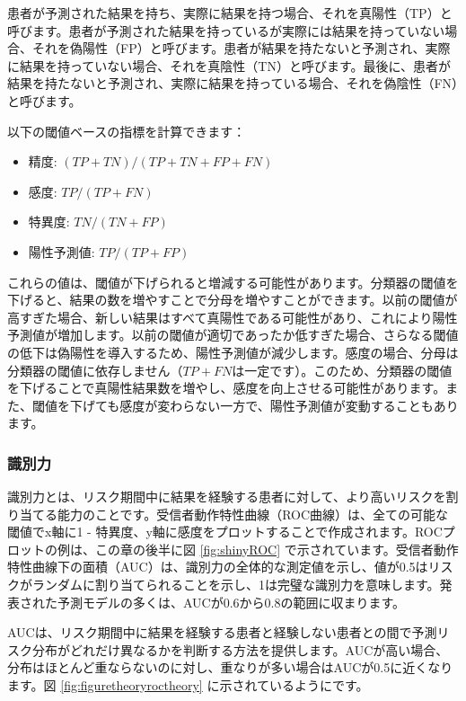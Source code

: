 \documentclass[
  11pt]{book}
\providecommand{\tightlist}{%
  \setlength{\itemsep}{0pt}\setlength{\parskip}{0pt}}
\theoremstyle{definition}
\theoremstyle{definition}
\theoremstyle{definition}
\theoremstyle{definition}
\theoremstyle{remark}
\begin{document}
患者が予測された結果を持ち、実際に結果を持つ場合、それを真陽性（TP）と呼びます。患者が予測された結果を持っているが実際には結果を持っていない場合、それを偽陽性（FP）と呼びます。患者が結果を持たないと予測され、実際に結果を持っていない場合、それを真陰性（TN）と呼びます。最後に、患者が結果を持たないと予測され、実際に結果を持っている場合、それを偽陰性（FN）と呼びます。    

以下の閾値ベースの指標を計算できます：

\begin{itemize}
\tightlist
\item
  精度: \((TP+TN)/(TP+TN+FP+FN)\)
\item
  感度: \(TP/(TP+FN)\)
\item
  特異度: \(TN/(TN+FP)\)
\item
  陽性予測値: \(TP/(TP+FP)\)
\end{itemize}

これらの値は、閾値が下げられると増減する可能性があります。分類器の閾値を下げると、結果の数を増やすことで分母を増やすことができます。以前の閾値が高すぎた場合、新しい結果はすべて真陽性である可能性があり、これにより陽性予測値が増加します。以前の閾値が適切であったか低すぎた場合、さらなる閾値の低下は偽陽性を導入するため、陽性予測値が減少します。感度の場合、分母は分類器の閾値に依存しません（\(TP+FN\)は一定です）。このため、分類器の閾値を下げることで真陽性結果数を増やし、感度を向上させる可能性があります。また、閾値を下げても感度が変わらない一方で、陽性予測値が変動することもあります。

\subsubsection*{識別力}\label{ux8b58ux5225ux529b}

識別力とは、リスク期間中に結果を経験する患者に対して、より高いリスクを割り当てる能力のことです。受信者動作特性曲線（ROC曲線）は、全ての可能な閾値でx軸に1 - 特異度、y軸に感度をプロットすることで作成されます。ROCプロットの例は、この章の後半に図 \ref{fig:shinyROC} で示されています。受信者動作特性曲線下の面積（AUC）は、識別力の全体的な測定値を示し、値が0.5はリスクがランダムに割り当てられることを示し、1は完璧な識別力を意味します。発表された予測モデルの多くは、AUCが0.6から0.8の範囲に収まります。   

AUCは、リスク期間中に結果を経験する患者と経験しない患者との間で予測リスク分布がどれだけ異なるかを判断する方法を提供します。AUCが高い場合、分布はほとんど重ならないのに対し、重なりが多い場合はAUCが0.5に近くなります。図 \ref{fig:figuretheoryroctheory} に示されているようにです。
\end{document}
